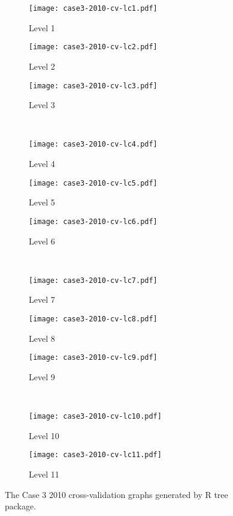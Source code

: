 \begin{appendices}
\begin{figure}[!ht] \centering
	\captionsetup[subfigure]{width=2.0in}
	\begin{subfigure}[t]{0.32\textwidth}
		\texttt{[image: case3-2010-cv-lc1.pdf]}
		\caption{Level 1}
	\end{subfigure}
	\begin{subfigure}[t]{0.32\textwidth}
		\texttt{[image: case3-2010-cv-lc2.pdf]}
		\caption{Level 2}
	\end{subfigure}
	\begin{subfigure}[t]{0.32\textwidth}
		\texttt{[image: case3-2010-cv-lc3.pdf]}
		\caption{Level 3}
	\end{subfigure}\\
	\vspace{5pt}
	\begin{subfigure}[t]{0.32\textwidth}
		\texttt{[image: case3-2010-cv-lc4.pdf]}
		\caption{Level 4}
	\end{subfigure}
	\begin{subfigure}[t]{0.32\textwidth}
		\texttt{[image: case3-2010-cv-lc5.pdf]}
		\caption{Level 5}
	\end{subfigure}
	\begin{subfigure}[t]{0.32\textwidth}
		\texttt{[image: case3-2010-cv-lc6.pdf]}
		\caption{Level 6}
	\end{subfigure}\\
	\vspace{5pt}	
	\begin{subfigure}[t]{0.32\textwidth}
		\texttt{[image: case3-2010-cv-lc7.pdf]}
		\caption{Level 7}
	\end{subfigure}
	\begin{subfigure}[t]{0.32\textwidth}
		\texttt{[image: case3-2010-cv-lc8.pdf]}
		\caption{Level 8}
	\end{subfigure}
	\begin{subfigure}[t]{0.32\textwidth}
		\texttt{[image: case3-2010-cv-lc9.pdf]}
		\caption{Level 9}
	\end{subfigure}\\
	\vspace{5pt}
	\begin{subfigure}[t]{0.32\textwidth}
		\texttt{[image: case3-2010-cv-lc10.pdf]}
		\caption{Level 10}
	\end{subfigure}
	\begin{subfigure}[t]{0.32\textwidth}
		\texttt{[image: case3-2010-cv-lc11.pdf]}
		\caption{Level 11}
	\end{subfigure}
	\vspace{5pt}
	\caption[The Case 3 2010 cross-validation graphs generated by R tree package.]{The Case 3 2010 cross-validation graphs generated by R tree package.}
	\label{fig: appendix-fig.c24.cv}
\end{figure}


\end{appendices}
